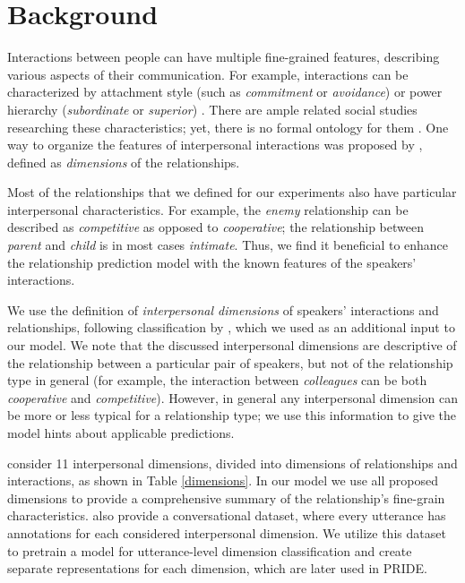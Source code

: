 
\section{Background}
\label{background}

Interactions between people can have multiple fine-grained features, describing various aspects of their communication. For example, interactions can be characterized by attachment style (such as \textit{commitment} or \textit{avoidance}) \cite{qamar2021relationship} or power hierarchy (\textit{subordinate} or \textit{superior}) \cite{prabhakaran2014predicting}. There are ample related social studies researching these characteristics; yet, there is no formal ontology for them \cite{rashid2018characterizing}. One way to organize the features of interpersonal interactions was proposed by \cite{rashid2017dimensions}, defined as \textit{dimensions} of the relationships.

Most of the relationships that we defined for our experiments also have particular interpersonal characteristics. For example, the \textit{enemy} relationship can be described as \textit{competitive} as opposed to \textit{cooperative}; the relationship between \textit{parent} and \textit{child} is in most cases \textit{intimate}. Thus, we find it beneficial to enhance the relationship prediction model with the known features of the speakers' interactions. 

We use the definition of \textit{interpersonal dimensions} \cite{wish1976perceived} of speakers' interactions and relationships, following classification by \citet{rashid2018characterizing}, which we used as an additional input to our model. We note that the discussed interpersonal dimensions are descriptive of the relationship between a particular pair of speakers, but not of the relationship type in general (for example, the interaction between \textit{colleagues} can be both \textit{cooperative} and \textit{competitive}). However, in general any interpersonal dimension can be more or less typical for a relationship type; we use this information to give the model hints about applicable predictions.

\citeauthor{rashid2018characterizing} consider 11 interpersonal dimensions, divided into dimensions of relationships and interactions, as shown in Table \ref{dimensions}. In our model we use all proposed dimensions to provide a comprehensive summary of the relationship's fine-grain characteristics. %
\citeauthor{rashid2018characterizing} also provide a conversational dataset, where every utterance has annotations for each considered interpersonal dimension. We utilize this dataset to pretrain a model for utterance-level dimension classification and create separate representations for each dimension, which are later used in PRIDE.

